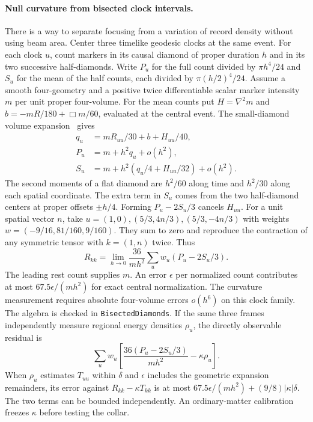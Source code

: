\documentclass[11pt]{article}
\begin{document}
\paragraph{Null curvature from bisected clock intervals.}
\label{par:bisected-null-curvature}
There is a way to separate focusing from a variation of record density
without using beam area. Center three timelike geodesic clocks at the
same event. For each clock \(u\), count markers in its causal diamond
of proper duration \(h\) and in its two successive half-diamonds.
Write \(P_u\) for the full count divided by \(\pi h^4/24\) and
\(S_u\) for the mean of the half counts, each divided by
\(\pi(h/2)^4/24\). Assume a smooth four-geometry and a positive
twice differentiable scalar marker intensity \(m\) per unit proper
four-volume. For the mean counts put \(H=\nabla^2m\) and
\(b=-mR/180+\Box m/60\), evaluated at the central event. The
small-diamond volume expansion~\cite{pwgibbons2007geometry} gives
\begin{align*}
 q_u &= mR_{uu}/30+b+H_{uu}/40,\\
 P_u &= m+h^2 q_u+o(h^2),\\
 S_u &= m+h^2(q_u/4+H_{uu}/32)+o(h^2).
\end{align*}
The second moments of a flat diamond are \(h^2/60\) along time and
\(h^2/30\) along each spatial coordinate. The extra term in \(S_u\)
comes from the two half-diamond centers at proper offsets
\(\pm h/4\). Forming \(P_u-2S_u/3\) cancels \(H_{uu}\). For a unit
spatial vector \(n\), take
\(u=(1,0),(5/3,4n/3),(5/3,-4n/3)\) with weights
\(w=(-9/16,81/160,9/160)\). They sum to zero and reproduce the
contraction of any symmetric tensor with \(k=(1,n)\) twice. Thus
\[
 R_{kk}=\lim_{h\to0}\frac{36}{m h^2}
            \sum_u w_u(P_u-2S_u/3).
\]
The leading rest count supplies \(m\). An error \(\epsilon\) per
normalized count contributes at most \(67.5\epsilon/(mh^2)\) for
exact central normalization. The curvature measurement requires
absolute four-volume errors \(o(h^6)\) on this clock family. The
algebra is checked in \texttt{BisectedDiamonds}. If the same three
frames independently measure regional energy densities \(\rho_u\),
the directly observable residual is
\[
 \sum_u w_u\left[\frac{36(P_u-2S_u/3)}{mh^2}-\kappa\rho_u\right].
\]
When \(\rho_u\) estimates \(T_{uu}\) within \(\delta\) and
\(\epsilon\) includes the geometric expansion remainders, its error
against \(R_{kk}-\kappa T_{kk}\) is at most
\(67.5\epsilon/(mh^2)+(9/8)|\kappa|\delta\).
The two terms can be bounded independently. An ordinary-matter
calibration freezes \(\kappa\) before testing the collar.
\end{document}
